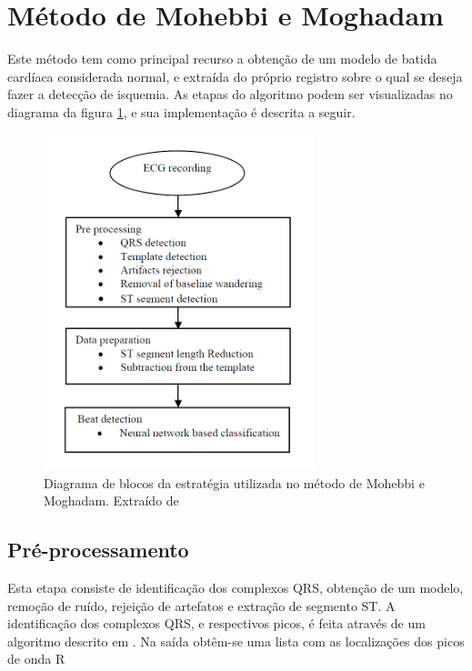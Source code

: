 
\section{Método de Mohebbi e Moghadam}
\label{sec:section3}
Este método tem como principal recurso a obtenção de um modelo de batida cardíaca considerada normal, e extraída do próprio registro sobre o qual se deseja fazer a detecção de isquemia. As etapas do algoritmo podem ser visualizadas no diagrama da figura \ref{fig:mohebbi_01}, e sua implementação é descrita a seguir.

\begin{figure}[ht]
    \centering
    \includegraphics[width=0.7\textwidth]{figures/mohebbi_01.png}
    \caption{Diagrama de blocos da estratégia utilizada no método de Mohebbi e Moghadam. Extraído de \cite{Mohebbi07}}
    \label{fig:mohebbi_01}
\end{figure}

\subsection{Pré-processamento}
Esta etapa consiste de identificação dos complexos QRS, obtenção de um modelo, remoção de ruído, rejeição de artefatos e extração de segmento ST. A identificação dos complexos QRS, e respectivos picos, é feita através de um algoritmo descrito em \cite{Tompkins85}. Na saída obtêm-se uma lista com as localizações dos picos de onda R

